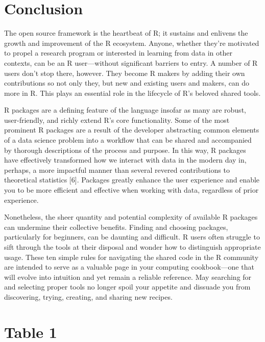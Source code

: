 \documentclass[10pt,letterpaper]{article}
\begin{document}
\hypertarget{conclusion}{%
\section{Conclusion}\label{conclusion}}

The open source framework is the heartbeat of R; it sustains and
enlivens the growth and improvement of the R ecosystem. Anyone, whether
they're motivated to propel a research program or interested in learning
from data in other contexts, can be an R user---without significant
barriers to entry. A number of R users don't stop there, however. They
become R makers by adding their own contributions so not only they, but
new and existing users and makers, can do more in R. This plays an
essential role in the lifecycle of R's beloved shared tools.

R packages are a defining feature of the language insofar as many are
robust, user-friendly, and richly extend R's core functionality. Some of
the most prominent R packages are a result of the developer abstracting
common elements of a data science problem into a workflow that can be
shared and accompanied by thorough descriptions of the process and
purpose. In this way, R packages have effectively transformed how we
interact with data in the modern day in, perhaps, a more impactful
manner than several revered contributions to theoretical statistics
{[}6{]}. Packages greatly enhance the user experience and enable you to
be more efficient and effective when working with data, regardless of
prior experience.

Nonetheless, the sheer quantity and potential complexity of available R
packages can undermine their collective benefits. Finding and choosing
packages, particularly for beginners, can be daunting and difficult. R
users often struggle to sift through the tools at their disposal and
wonder how to distinguish appropriate usage. These ten simple rules for
navigating the shared code in the R community are intended to serve as a
valuable page in your computing cookbook---one that will evolve into
intuition and yet remain a reliable reference. May searching for and
selecting proper tools no longer spoil your appetite and dissuade you
from discovering, trying, creating, and sharing new recipes.

\hypertarget{table-1}{%
\section{Table 1}\label{table-1}}
\end{document}
